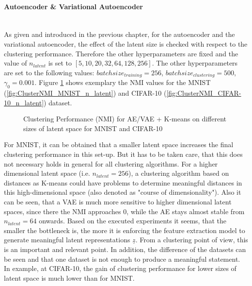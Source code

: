 \documentclass[12pt,DIV14,BCOR12mm,a4paper,footexclude,headinclude,halfparskip-,twoside,openright,cleardoubleempty,idxtotoc,bibtotoc,listtotoc,abstracton]{scrreprt} %
\numberwithin{equation}{chapter}
\begin{document}
\paragraph{Autoencoder \& Variational Autoencoder}\hfill \\
As given and introduced in the previous chapter, for the autoencoder and the variational autoencoder, the effect of the latent size is checked with respect to the clustering performance. Therefore the other hyperparameters are fixed and the value of $n_{latent}$ is set to $[5, 10, 20, 32, 64, 128, 256]$. The other hyperparameters are set to the following values: $batchsize_{training} = 256$, $batchsize_{clustering} = 500$, $\gamma_0 = 0.001$. Figure \ref{fig:ClusterPerformance_latentSpace} shows exemplary the NMI values for the MNIST (\ref{fig:ClusterNMI_MNIST_n_latent}) and CIFAR-10 (\ref{fig:ClusterNMI_CIFAR-10_n_latent}) dataset.
	\begin{figure}[htb!]
		\centering
		\qquad
		\caption{Clustering Performance (NMI) for AE/VAE + K-means on different sizes of latent space for MNIST and CIFAR-10}
		\label{fig:ClusterPerformance_latentSpace}
	\end{figure}
For MNIST, it can be obtained that a smaller latent space increases the final clustering performance in this set-up. But it has to be taken care, that this does not necessary holds in general for all clustering algorithms. For a higher dimensional latent space (i.e. $n_{latent} = 256$), a clustering algorithm based on distances as K-means could have problems to determine meaningful distances in this high-dimensional space (also denoted as "course of dimensionality"). Also it can be seen, that a VAE is much more sensitive to higher dimensional latent spaces, since there the NMI approaches $0$, while the AE stays almost stable from $n_{latent} = 64$ onwards. Based on the executed experiments it seems, that the smaller the bottleneck is, the more it is enforcing the feature extraction model to generate meaningful latent representations $\underline{z}$. From a clustering point of view, this is an important and relevant point. In addition, the difference of the datasets can be seen and that one dataset is not enough to produce a meaningful statement. In example, at CIFAR-10, the gain of clustering performance for lower sizes of latent space is much lower than for MNIST.\\
\end{document}

